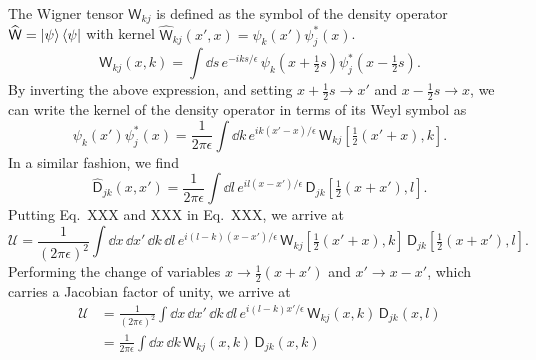 The Wigner tensor $\mathsf{W}_{kj}$ is defined as the symbol of the density operator $\widehat{\mathsf{W}} = \mathinner{\lvert{\psi}\rangle}\mathinner{\langle{\psi}\rvert}$ with kernel $\widehat{\mathsf{W}}_{kj}(x',x) = \psi_{k}(x')\psi_{j}^{*}(x)$.
%
\begin{equation}
  \mathsf{W}_{kj}(x, k) = \int \dd{s}\, e^{-iks/\epsilon}\, \psi_{k}\left(x + \tfrac{1}{2}s\right)\psi^{*}_{j}\left(x - \tfrac{1}{2}s\right).
\end{equation}
%
By inverting the above expression, and setting $x + \frac{1}{2}s \to x'$ and $x- \frac{1}{2}s \to x$, we can write the kernel of the density operator in terms of its Weyl symbol as
%
%
\begin{equation}
  \psi_{k}(x') \psi^{*}_{j}(x) = \frac{1}{2\pi \epsilon} \int \dd{k}\, e^{ik(x' -x)/\epsilon}\,\mathsf{W}_{kj}\left[\tfrac{1}{2}(x' + x), k\right].
\end{equation}
%
In a similar fashion, we find
%
\begin{equation}
  \widehat{\mathsf{D}}_{jk}(x, x') = \frac{1}{2\pi\epsilon} \int \dd{l}\, e^{il(x -x')/\epsilon}\,\mathsf{D}_{jk}\left[\tfrac{1}{2}(x + x'), l\right].
\end{equation}
%
Putting Eq.~XXX and XXX in Eq.~XXX, we arrive at
%
\begin{equation}
  \mathscr{U} = \frac{1}{(2\pi\epsilon)^{2}}\int \dd{x}\,\dd{x'}\,\dd{k}\,\dd{l}\, e^{i(l-k)(x -x')/\epsilon}\,\mathsf{W}_{kj}\left[\tfrac{1}{2}(x' + x), k\right]\, \mathsf{D}_{jk}\left[\tfrac{1}{2}(x + x'), l\right].
\end{equation}
%
Performing the change of variables $x \to \frac{1}{2}(x + x')$ and $x' \to x - x'$, which carries a Jacobian factor of unity, we arrive at
%
\begin{equation}
  \begin{aligned}
    \mathscr{U} &= \frac{1}{(2\pi\epsilon)^{2}}\int \dd{x}\,\dd{x'}\,\dd{k}\,\dd{l}\, e^{i(l-k)x'/\epsilon}\,\mathsf{W}_{kj}(x, k)\, \mathsf{D}_{jk}(x, l)\\
                &= \frac{1}{2\pi\epsilon}\int \dd{x}\,\dd{k}\,\mathsf{W}_{kj}(x,k)\,\mathsf{D}_{jk}(x, k)
  \end{aligned}
\end{equation}
%

